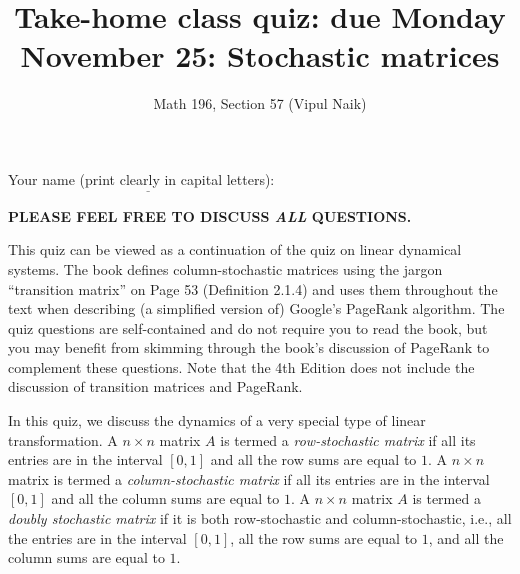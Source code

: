 \documentclass[10pt]{amsart}
\title{Take-home class quiz: due Monday November 25: Stochastic matrices}
\author{Math 196, Section 57 (Vipul Naik)}
\begin{document}
\maketitle

Your name (print clearly in capital letters): $\underline{\qquad\qquad\qquad\qquad\qquad\qquad\qquad\qquad\qquad\qquad}$

{\bf PLEASE FEEL FREE TO DISCUSS {\em ALL} QUESTIONS.}

This quiz can be viewed as a continuation of the quiz on linear
dynamical systems. The book defines column-stochastic matrices using
the jargon ``transition matrix'' on Page 53 (Definition 2.1.4) and
uses them throughout the text when describing (a simplified version
of) Google's PageRank algorithm. The quiz questions are self-contained
and do not require you to read the book, but you may benefit from
skimming through the book's discussion of PageRank to complement these
questions. Note that the 4th Edition does not include the discussion
of transition matrices and PageRank.

In this quiz, we discuss the dynamics of a very special type of linear
transformation. A $n \times n$ matrix $A$ is termed a {\em
  row-stochastic matrix} if all its entries are in the interval
$[0,1]$ and all the row sums are equal to $1$. A $n \times n$ matrix
is termed a {\em column-stochastic matrix} if all its entries are in
the interval $[0,1]$ and all the column sums are equal to $1$. A $n
\times n$ matrix $A$ is termed a {\em doubly stochastic matrix} if it
is both row-stochastic and column-stochastic, i.e., all the entries
are in the interval $[0,1]$, all the row sums are equal to $1$, and
all the column sums are equal to $1$.
\end{document}
